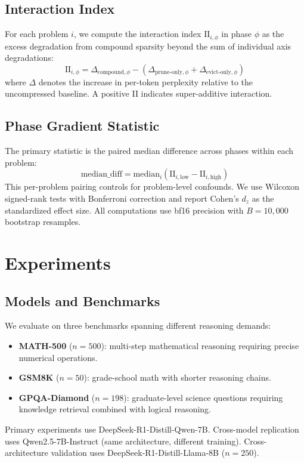 \documentclass[11pt,a4paper]{article}
\begin{document}
\subsection{Interaction Index}

For each problem $i$, we compute the interaction index $\text{II}_{i,\phi}$ in phase $\phi$ as the excess degradation from compound sparsity beyond the sum of individual axis degradations:
\begin{equation}
\text{II}_{i,\phi} = \Delta_{\text{compound},\phi} - (\Delta_{\text{prune-only},\phi} + \Delta_{\text{evict-only},\phi})
\end{equation}
where $\Delta$ denotes the increase in per-token perplexity relative to the uncompressed baseline. A positive II indicates super-additive interaction.

\subsection{Phase Gradient Statistic}

The primary statistic is the paired median difference across phases within each problem:
\begin{equation}
\text{median\_diff} = \text{median}_i(\text{II}_{i,\text{low}} - \text{II}_{i,\text{high}})
\end{equation}
This per-problem pairing controls for problem-level confounds. We use Wilcoxon signed-rank tests with Bonferroni correction and report Cohen's $d_z$ as the standardized effect size. All computations use bf16 precision with $B{=}10{,}000$ bootstrap resamples.

\section{Experiments}

\subsection{Models and Benchmarks}

We evaluate on three benchmarks spanning different reasoning demands:
\begin{itemize}
\item \textbf{MATH-500} ($n{=}500$): multi-step mathematical reasoning requiring precise numerical operations.
\item \textbf{GSM8K} ($n{=}50$): grade-school math with shorter reasoning chains.
\item \textbf{GPQA-Diamond} ($n{=}198$): graduate-level science questions requiring knowledge retrieval combined with logical reasoning.
\end{itemize}
Primary experiments use DeepSeek-R1-Distill-Qwen-7B. Cross-model replication uses Qwen2.5-7B-Instruct (same architecture, different training). Cross-architecture validation uses DeepSeek-R1-Distill-Llama-8B ($n{=}250$).
\end{document}

